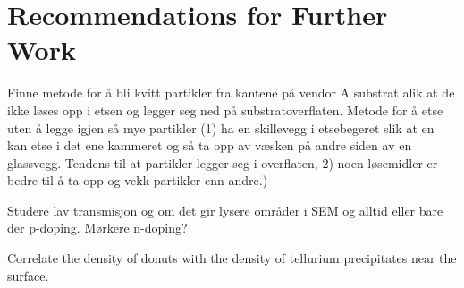 \chapter{Recommendations for Further Work}\label{ch:further-work}
%

Finne metode for å bli kvitt partikler fra kantene på vendor A substrat alik at de ikke løses opp i etsen og legger seg ned på substratoverflaten. Metode for å etse uten å legge igjen så mye partikler (1) ha en skillevegg i etsebegeret slik at en kan etse i det ene kammeret og så ta opp av væsken på andre siden av en glassvegg. Tendens til at partikler legger seg i overflaten, 2) noen løsemidler er bedre til å ta opp og vekk partikler enn andre.)

Studere lav transmisjon og om det gir lysere områder i SEM og alltid eller bare der p-doping. Mørkere n-doping?

Correlate the density of donuts with the density of tellurium precipitates near the surface.


